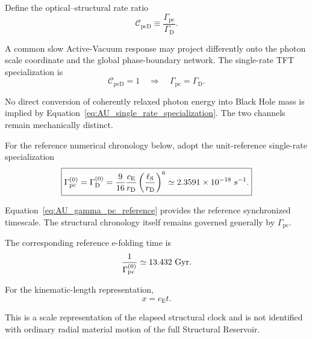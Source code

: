 Define the optical--structural rate ratio
\begin{equation}
    \boxed{
    \mathcal C_{\mathrm{pcD}}
    \equiv
    \frac{
        \Gamma_{\mathrm{pc}}
    }{
        \Gamma_{\mathrm D}
    }.
    }
    \label{eq:AU_pcD_ratio}
\end{equation}

A common slow Active-Vacuum response may project differently onto the photon
scale coordinate and the global phase-boundary network. The single-rate TFT
specialization is
\begin{equation}
    \boxed{
    \mathcal C_{\mathrm{pcD}}
    =
    1
    \quad\Longrightarrow\quad
    \Gamma_{\mathrm{pc}}
    =
    \Gamma_{\mathrm D}.
    }
    \label{eq:AU_single_rate_specialization}
\end{equation}

No direct conversion of coherently relaxed photon energy into Black Hole mass
is implied by
Equation~\eqref{eq:AU_single_rate_specialization}. The two channels remain
mechanically distinct.

For the reference numerical chronology below, adopt the unit-reference
single-rate specialization
\begin{equation}
    \boxed{
    \Gamma_{\mathrm{pc}}^{(0)}
    =
    \Gamma_{\mathrm D}^{(0)}
    =
    \frac{9}{16}
    \frac{
        c_{\mathrm E}
    }{
        r_{\mathrm D}
    }
    \left(
        \frac{
            \ell_{\mathrm S}
        }{
            r_{\mathrm D}
        }
    \right)^6
    \simeq
    2.3591\times10^{-18}
    \ {\rm s^{-1}}.
    }
    \label{eq:AU_gamma_pc_reference}
\end{equation}

Equation~\eqref{eq:AU_gamma_pc_reference}
provides the reference synchronized timescale. The structural chronology
itself remains governed generally by
\(\Gamma_{\mathrm{pc}}\).

The corresponding reference e-folding time is
\begin{equation}
    \frac{
        1
    }{
        \Gamma_{\mathrm{pc}}^{(0)}
    }
    \simeq
    13.432
    \ {\rm Gyr}.
    \label{eq:AU_pc_efold_time}
\end{equation}

For the kinematic-length representation,
\begin{equation}
    x
    =
    c_{\mathrm E}t.
\end{equation}

This is a scale representation of the elapsed structural clock and is not
identified with ordinary radial material motion of the full Structural
Reservoir.

